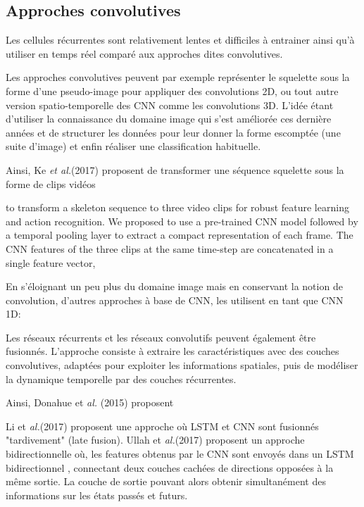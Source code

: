 \subsection{Approches convolutives}
Les cellules récurrentes sont relativement lentes et difficiles à entrainer ainsi qu'à utiliser en temps réel comparé aux approches dites convolutives.

Les approches convolutives peuvent par exemple représenter le squelette sous la forme d'une pseudo-image pour appliquer des convolutions 2D, ou tout autre version spatio-temporelle des CNN comme les convolutions 3D.
L’idée étant d’utiliser la connaissance du domaine image qui s’est améliorée ces dernière années et de structurer les données pour leur donner la forme escomptée (une suite d’image) et enfin réaliser une classification habituelle.

Ainsi, Ke \textit{et\textit{ al.}}(2017) \cite{ke2017new} proposent de transformer une séquence squelette sous la forme de clips vidéos

to transform a skeleton
sequence to three video clips for robust feature learning
and action recognition. We proposed to use a pre-trained
CNN model followed by a temporal pooling layer to extract
a compact representation of each frame. The CNN features
of the three clips at the same time-step are concatenated in
a single feature vector,


En s'éloignant un peu plus du domaine image mais en conservant la notion de convolution, d'autres approches à base de CNN, les utilisent en tant que CNN 1D: 

Les réseaux récurrents et les réseaux convolutifs peuvent également être fusionnés. L'approche consiste à extraire les caractéristiques avec des couches convolutives, adaptées pour exploiter les informations spatiales, puis de modéliser la dynamique temporelle par des couches récurrentes.

Ainsi, Donahue et\textit{ al.} (2015) \cite{donahue2015long} proposent 

Li et\textit{ al.}(2017)\cite{li2017skeleton} proposent une approche où LSTM et CNN sont fusionnés "tardivement" (late fusion). Ullah et\textit{ al.}(2017)\cite{ullah2017action} proposent un approche bidirectionnelle où, les features obtenus par le CNN sont envoyés dans un LSTM bidirectionnel \cite{Schuster97bidirectionalrecurrent}, connectant deux couches cachées de directions opposées à la même sortie. La couche de sortie pouvant alors obtenir simultanément des informations sur les états passés et futurs.



